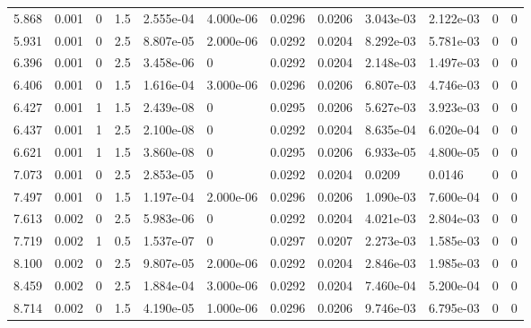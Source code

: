 \documentclass[preview]{standalone}
\begin{document}
{{\begin{tabular}{L{1.2cm}C{1.2cm} C{0.3cm}C{0.5cm} C{1.4cm}C{1.4cm} C{1.4cm}C{1.4cm} C{1.6cm}C{1.6cm} C{1.6cm}C{1.6cm}}
  5.868  &  0.001  & 0     & 1.5 &  2.555e-04  & 4.000e-06  &  0.0296&   0.0206& 3.043e-03 & 2.122e-03   &  0 & 0  \\ 
  5.931  &  0.001  & 0     & 2.5 &  8.807e-05  & 2.000e-06  &  0.0292&   0.0204& 8.292e-03 & 5.781e-03   &  0 & 0  \\ 
  6.396  &  0.001  & 0     & 2.5 &  3.458e-06  & 0  &  0.0292&   0.0204& 2.148e-03 & 1.497e-03   &  0 & 0  \\ 
  6.406  &  0.001  & 0     & 1.5 &  1.616e-04  & 3.000e-06  &  0.0296&   0.0206& 6.807e-03 & 4.746e-03   &  0 & 0  \\ 
  6.427  &  0.001  & 1     & 1.5 &  2.439e-08  & 0  &  0.0295&   0.0206& 5.627e-03 & 3.923e-03   &  0 & 0  \\ 
  6.437  &  0.001  & 1     & 2.5 &  2.100e-08  & 0  &  0.0292&   0.0204& 8.635e-04 & 6.020e-04   &  0 & 0  \\ 
  6.621  &  0.001  & 1     & 1.5 &  3.860e-08  & 0  &  0.0295&   0.0206& 6.933e-05 & 4.800e-05   &  0 & 0  \\ 
  7.073  &  0.001  & 0     & 2.5 &  2.853e-05  & 0  &  0.0292&   0.0204& 0.0209 & 0.0146   &  0 & 0  \\ 
  7.497  &  0.001  & 0     & 1.5 &  1.197e-04  & 2.000e-06  &  0.0296&   0.0206& 1.090e-03 & 7.600e-04   &  0 & 0  \\ 
  7.613  &  0.002  & 0     & 2.5 &  5.983e-06  & 0  &  0.0292&   0.0204& 4.021e-03 & 2.804e-03   &  0 & 0  \\ 
  7.719  &  0.002  & 1     & 0.5 &  1.537e-07  & 0  &  0.0297&   0.0207& 2.273e-03 & 1.585e-03   &  0 & 0  \\ 
  8.100  &  0.002  & 0     & 2.5 &  9.807e-05  & 2.000e-06  &  0.0292&   0.0204& 2.846e-03 & 1.985e-03   &  0 & 0  \\ 
  8.459  &  0.002  & 0     & 2.5 &  1.884e-04  & 3.000e-06  &  0.0292&   0.0204& 7.460e-04 & 5.200e-04   &  0 & 0  \\ 
  8.714  &  0.002  & 0     & 1.5 &  4.190e-05  & 1.000e-06  &  0.0296&   0.0206& 9.746e-03 & 6.795e-03   &  0 & 0  \\ 
\hline 
\end{tabular} 

}}
\end{document}
